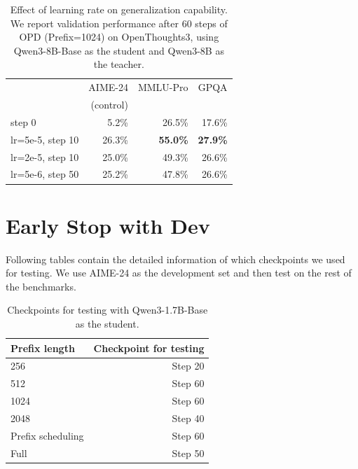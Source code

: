 \documentclass[11pt]{article}
\begin{document}
\begin{table}[h!]  
\centering  
\small
\begin{tabular}{l|r|r|r}  
\hline  
& AIME-24 & MMLU-Pro  &    GPQA      \\
& (control) &   &         \\
    \hline  
step 0 & 5.2\%& 26.5\%& 17.6\% \\
lr=5e-5, step 10  & 26.3\%  & \textbf{55.0\%}  & \textbf{27.9\%} \\ 
lr=2e-5, step 10  & 25.0\%  & 49.3\%  & 26.6\% \\ 
lr=5e-6, step 50  & 25.2\%  & 47.8\%  & 26.6\% \\  

\hline  
\end{tabular}  
\caption{Effect of learning rate on generalization capability. We report validation performance after 60 steps of OPD (Prefix=1024) on OpenThoughts3, using Qwen3-8B-Base as the student and Qwen3-8B as the teacher.}  
\label{tab:learning rate}  
\end{table}  


\section{Early Stop with Dev}
\label{appendix: early stop}
Following tables contain the detailed information of which checkpoints we used for testing. We use AIME-24 as the development set and then test on the rest of the benchmarks.

\begin{table}[h!]  
\centering  
\small  
\begin{tabular}{l|r}  
\hline  
 Prefix length & Checkpoint for testing \\ 
 
\hline
256 & Step 20   \\ 
512 & Step 60   \\ 
1024 & Step 60   \\ 
2048 & Step 40   \\ 
Prefix scheduling & Step 60 \\
Full & Step 50   \\ 
\hline
\end{tabular}  
\caption{Checkpoints for testing with Qwen3-1.7B-Base as the student.}
\label{tab:early stop 1.7b}  
\end{table}  
\end{document}
